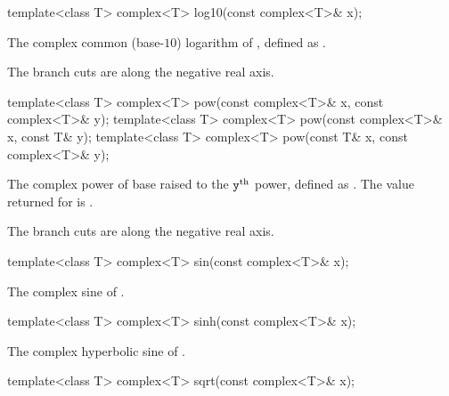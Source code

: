 %
\begin{itemdecl}
template<class T> complex<T> log10(const complex<T>& x);
\end{itemdecl}

\begin{itemdescr}
\pnum
\returns
The complex common (base-$10$) logarithm of , defined as
.

\pnum
\remarks
The branch cuts are along the negative real axis.
\end{itemdescr}

%
\begin{itemdecl}
template<class T> complex<T> pow(const complex<T>& x, const complex<T>& y);
template<class T> complex<T> pow(const complex<T>& x, const T& y);
template<class T> complex<T> pow(const T& x, const complex<T>& y);
\end{itemdecl}

\begin{itemdescr}
\pnum
\returns
The complex power of base  raised to the $\texttt{y}^\text{th}$ power,
defined as
.
The value returned for
is .

\pnum
\remarks
The branch cuts are along the negative real axis.
\end{itemdescr}

%
\begin{itemdecl}
template<class T> complex<T> sin(const complex<T>& x);
\end{itemdecl}

\begin{itemdescr}
\pnum
\returns
The complex sine of .
\end{itemdescr}

%
\begin{itemdecl}
template<class T> complex<T> sinh(const complex<T>& x);
\end{itemdecl}

\begin{itemdescr}
\pnum
\returns
The complex hyperbolic sine of .
\end{itemdescr}

%
\begin{itemdecl}
template<class T> complex<T> sqrt(const complex<T>& x);
\end{itemdecl}


